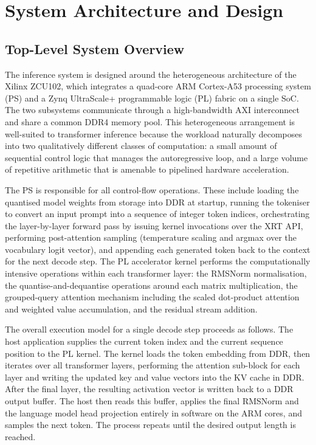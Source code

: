 
\chapter{System Architecture and Design}
\label{ch:architecture}

\section{Top-Level System Overview}
\label{sec:system_overview}

The inference system is designed around the heterogeneous architecture of the
Xilinx ZCU102, which integrates a quad-core ARM Cortex-A53 processing system
(PS) and a Zynq UltraScale+ programmable logic (PL) fabric on a single SoC.
The two subsystems communicate through a high-bandwidth AXI interconnect and
share a common DDR4 memory pool. This heterogeneous arrangement is well-suited
to transformer inference because the workload naturally decomposes into two
qualitatively different classes of computation: a small amount of sequential
control logic that manages the autoregressive loop, and a large volume of
repetitive arithmetic that is amenable to pipelined hardware acceleration.

The PS is responsible for all control-flow operations. These include loading
the quantised model weights from storage into DDR at startup, running the
tokeniser to convert an input prompt into a sequence of integer token indices,
orchestrating the layer-by-layer forward pass by issuing kernel invocations
over the XRT API, performing post-attention sampling (temperature scaling and
argmax over the vocabulary logit vector), and appending each generated token
back to the context for the next decode step. The PL accelerator kernel
performs the computationally intensive operations within each transformer
layer: the RMSNorm normalisation, the quantise-and-dequantise operations
around each matrix multiplication, the grouped-query attention mechanism
including the scaled dot-product attention and weighted value accumulation,
and the residual stream addition.

The overall execution model for a single decode step proceeds as follows.
The host application supplies the current token index and the current
sequence position to the PL kernel. The kernel loads the token embedding
from DDR, then iterates over all transformer layers, performing the attention
sub-block for each layer and writing the updated key and value vectors into
the KV cache in DDR. After the final layer, the resulting activation vector
is written back to a DDR output buffer. The host then reads this buffer,
applies the final RMSNorm and the language model head projection entirely in
software on the ARM cores, and samples the next token. The process repeats
until the desired output length is reached.

